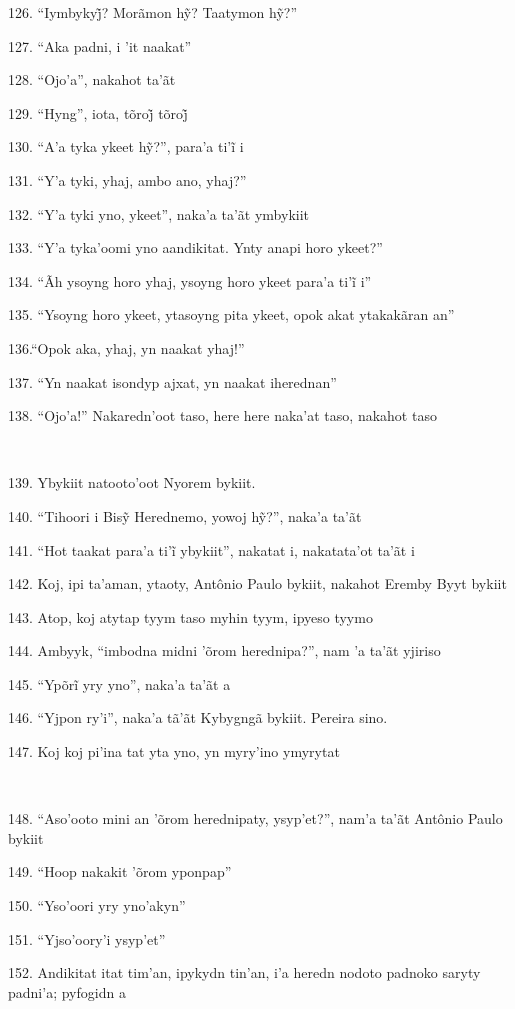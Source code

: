 126. “Iymbykyj̃? Morãmon hỹ? Taatymon hỹ?”

127. ``Aka padni, i 'it naakat''

128. ``Ojo'a'', nakahot ta'ãt

129. “Hyng”, iota, tõroj̃ tõroj̃

130. “A’a tyka ykeet hỹ?”, para’a ti’ĩ i

131. ``Y'a tyki, yhaj, ambo ano, yhaj?''

132. ``Y'a tyki yno, ykeet'', naka'a ta'ãt ymbykiit

133. ``Y'a tyka'oomi yno aandikitat. Ynty anapi horo ykeet?''

134. “Ãh ysoyng horo yhaj, ysoyng horo ykeet para’a ti’ĩ i”

135. ``Ysoyng horo ykeet, ytasoyng pita ykeet, opok akat ytakakãran an''

136.``Opok aka, yhaj, yn naakat yhaj!''

137. ``Yn naakat isondyp ajxat, yn naakat iherednan''

138. ``Ojo'a!'' Nakaredn'oot taso, here here naka'at taso, nakahot taso

~

139. Ybykiit natooto'oot Nyorem bykiit.

140. “Tihoori i Bisỹ Herednemo, yowoj hỹ?”, naka’a ta’ãt

141. “Hot taakat para’a ti’ĩ ybykiit”, nakatat i, nakatata’ot ta’ãt i

142. Koj, ipi ta'aman, ytaoty, Antônio Paulo bykiit, nakahot Eremby Byyt bykiit

143. Atop, koj atytap tyym taso myhin tyym, ipyeso tyymo

144. Ambyyk, ``imbodna midni 'õrom herednipa?'', nam 'a ta'ãt yjiriso

145. “Ypõrĩ yry yno”, naka’a ta’ãt a

146. ``Yjpon ry'i'', naka'a tã'ãt Kybygngã bykiit. Pereira sino.

147. Koj koj pi'ina tat yta yno, yn myry'ino ymyrytat

~

148. ``Aso'ooto mini an 'õrom herednipaty, ysyp'et?'', nam'a ta'ãt
Antônio Paulo bykiit

149. ``Hoop nakakit 'õrom yponpap''

150. ``Yso'oori yry yno'akyn''

151. ``Yjso'oory'i ysyp'et''

152. Andikitat itat tim'an, ipykydn tin'an, i'a heredn nodoto padnoko
saryty padni'a; pyfogidn a

